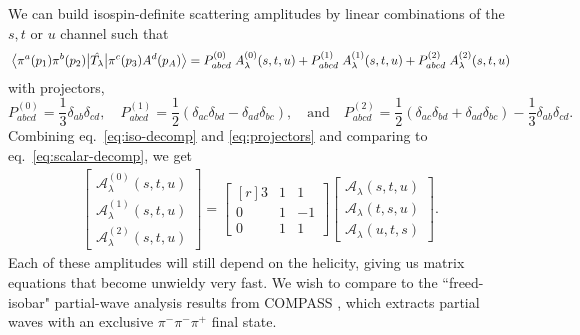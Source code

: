 \documentclass[10pt, aps,prd,amsmath,amssymb,superscriptaddress,onecolumn,
nofootinbib,showpacs,preprintnumbers]{revtex4-1}
\begin{document}
We can build isospin-definite scattering amplitudes by linear combinations of the \(s,t \text{ or } u\) channel such that
	\begin{equation}\label{eq:iso-decomp}
	  \mel{\pi^a(p_1)\pi^b(p_2)}{\hat{T_\lambda}}{\pi^c(p_3)A^d(p_A)} = P^{(0)}_{abcd} \; A_\lambda^{(0)}(s,t,u) + P^{(1)}_{abcd}  \; A_\lambda^{(1)}(s,t,u) +  P^{(2)}_{abcd} \; A_\lambda^{(2)}(s,t,u)
	\end{equation}
with projectors,
	\begin{equation} \label{eq:projectors}
	P^{(0)}_{abcd} = \frac{1}{3}\delta_{ab}\delta_{cd},  \quad P^{(1)}_{abcd} = \frac{1}{2}(\delta_{ac}\delta_{bd}-\delta_{ad}\delta_{bc}),  \quad \textrm{and} \quad   P^{(2)}_{abcd} = \frac{1}{2}
	(\delta_{ac}\delta_{bd} + \delta_{ad}\delta_{bc}) - \frac{1}{3} \delta_{ab}\delta_{cd}.
	\end{equation}
Combining eq.~\ref{eq:iso-decomp} and \ref{eq:projectors} and comparing to eq.~\ref{eq:scalar-decomp}, we get
    \begin{align} \label{eq:matrix}
      \begin{bmatrix}
      \mathcal{A}_\lambda^{(0)}(s,t,u) \\ \mathcal{A}_\lambda^{(1)} (s,t,u) \\ \mathcal{A}_\lambda^{(2)}(s,t,u)
      \end{bmatrix}
    =
      \begin{bmatrix*}[r]
        3 & 1 & 1 \\ 	0 & 1 & -1 \\ 0 & 1 & 1
      \end{bmatrix*}
      \begin{bmatrix}
      \mathcal{A}_\lambda(s,t,u) \\ \mathcal{A}_\lambda(t,s,u) \\ \mathcal{A}_\lambda(u,t,s)
      \end{bmatrix}.
    \end{align}
 Each of these amplitudes will still depend on the helicity, giving us matrix equations that become unwieldy very fast. We wish to compare to the ``freed-isobar" partial-wave analysis results from COMPASS \cite{COMPASS-Swave,Krinner:2017vch}, which extracts partial waves with an exclusive \(\pi^-\pi^-\pi^+\) final state.
\end{document}
